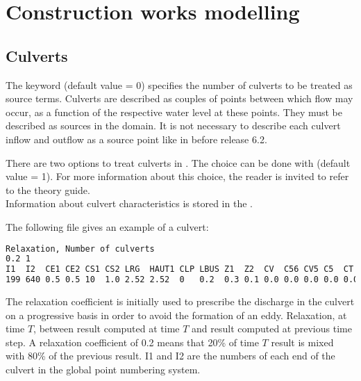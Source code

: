 \chapter{Construction works modelling}
\label{ch:constr:wm}

\section{Culverts}
\label{sec:culverts}
The keyword  (default value = 0) specifies
the number of culverts to be treated as source terms.
Culverts are described as couples of points between which flow may occur,
as a function of the respective water level at these points.
They must be described as sources in the domain.
It is not necessary to describe each culvert
inflow and outflow as a source point like in  before release 6.2.

There are two options to treat culverts in .
The choice can be done with 
(default value = 1).
For more information about this choice, the reader is invited to refer to the
 theory guide.\\

Information about culvert characteristics is stored in the
.

The following file gives an example of a culvert:
\begin{lstlisting}[language=bash]
Relaxation, Number of culverts
0.2 1
I1  I2  CE1 CE2 CS1 CS2 LRG  HAUT1 CLP LBUS Z1  Z2  CV  C56 CV5 C5  CT  HAUT2 FRIC LENGTH CIRC D1  D2 A1 A2  AA
199 640 0.5 0.5 10  1.0 2.52 2.52  0   0.2  0.3 0.1 0.0 0.0 0.0 0.0 0.0 2.52  0.0  0.0    1    90. 0. 0. 90. 0

\end{lstlisting}

The relaxation coefficient is initially used to prescribe the discharge
in the culvert on a progressive basis in order to avoid the formation of an eddy.
Relaxation, at time $T$, between result computed at time $T$ and result
computed at previous time step.
A relaxation coefficient of 0.2 means that 20\% of time $T$ result is mixed
with 80\% of the previous result.
I1 and I2 are the numbers of each end of the culvert in the global point
numbering system.

